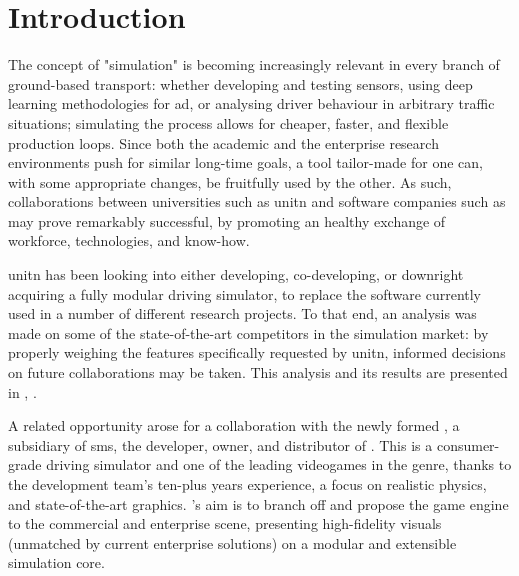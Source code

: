 \chapter*{Introduction}\label{ch:introduction}
\TOCsection{}

The concept of "simulation" is becoming increasingly relevant in every branch of ground-based transport: whether developing and testing sensors, using deep learning methodologies for \gls{ad}, or analysing driver behaviour in arbitrary traffic situations; simulating the process allows for cheaper, faster, and flexible production loops. Since both the academic and the enterprise research environments push for similar long-time goals, a tool tailor-made for one can, with some appropriate changes, be fruitfully used by the other. As such, collaborations between universities such as \gls{unitn} and software companies such as  may prove remarkably successful, by promoting an healthy exchange of workforce, technologies, and know-how.

\gls{unitn} has been looking into either developing, co-developing, or downright acquiring a fully modular driving simulator, to replace the software currently used in a number of different research projects. To that end, an analysis was made on some of the state-of-the-art competitors in the simulation market: by properly weighing the \glspl{feature} specifically requested by \gls{unitn}, informed decisions on future collaborations may be taken. This analysis and its results are presented in , .

A related opportunity arose for a collaboration with the newly formed , a subsidiary of \gls{sms}, the developer, owner, and distributor of . This is a consumer-grade driving simulator and one of the leading videogames in the genre, thanks to the development team's ten-plus years experience, a focus on realistic physics, and state-of-the-art graphics. 's aim is to branch off and propose the game engine to the commercial and enterprise scene, presenting high-fidelity visuals (unmatched by current enterprise solutions) on a modular and extensible simulation core.

